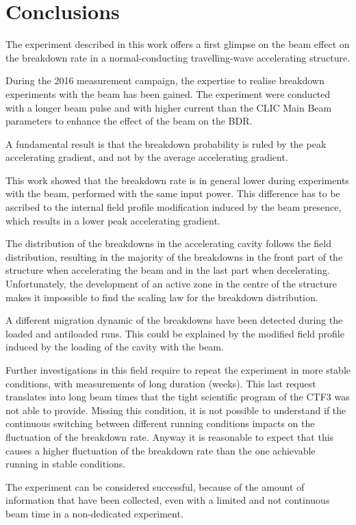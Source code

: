 \newpage
\section{Conclusions}

The experiment described in this work offers a first glimpse on the beam effect on the breakdown rate in a normal-conducting travelling-wave accelerating structure.

During the 2016 measurement campaign, the expertise to realise breakdown experiments with the beam has been gained. The experiment were conducted with a longer beam pulse and with higher current than the CLIC Main Beam parameters to enhance the effect of the beam on the BDR.

A fundamental result is that the breakdown probability is ruled by the peak accelerating gradient, and not by the average accelerating gradient.

This work showed that the breakdown rate is in general lower during experiments with the beam, performed with the same input power. This difference has to be ascribed to the internal field profile modification induced by the beam presence, which results in a lower peak accelerating gradient.

The distribution of the breakdowns in the accelerating cavity follows the field distribution, resulting in the majority of the breakdowns in the front part of the structure when accelerating the beam and in the last part when decelerating. Unfortunately, the development of an active zone in the centre of the structure makes it impossible to find the scaling law for the breakdown distribution. 

A different migration dynamic of the breakdowns have been detected during the loaded and antiloaded runs. This could be explained by the modified field profile induced by the loading of the cavity with the beam.

Further investigations in this field require to repeat the experiment in more stable conditions, with measurements of long duration (weeks). This last request translates into long beam times that the tight scientific program of the CTF3 was not able to provide. Missing this condition, it is not possible to understand if the continuous switching between different running conditions impacts on the fluctuation of the breakdown rate. Anyway it is reasonable to expect that this causes a higher fluctuation of the breakdown rate than the one achievable running in stable conditions. 

The experiment can be considered successful, because of the amount of information that have been collected, even with a limited and not continuous beam time in a non-dedicated experiment.



